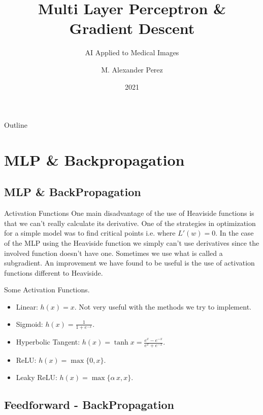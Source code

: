 \documentclass[presentation]{beamer}
\institute{Galileo University -- BiomedLab}
\author{M. Alexander Perez}
\date{2021}
\title{Multi Layer Perceptron \& Gradient Descent}
\subtitle{AI Applied to Medical Images}
\begin{document}
\maketitle
\begin{frame}{Outline}
\tableofcontents
\end{frame}


\section{MLP \& Backpropagation}
\label{sec:org0b67370}

\subsection{MLP \& BackPropagation}
\label{sec:org932be76}

\begin{frame}[label={sec:org665cab5}]{Activation Functions}
One main disadvantage of the use of Heaviside functions is that we can't really calculate its derivative. One of the strategies in optimization for a simple model was to find critical points i.e. where \(L'(w) = 0\). In the case of the MLP using the Heaviside function we simply can't use derivatives since the involved function doesn't have one. Sometimes we use what is called a subgradient. An improvement we have found to be useful is the use of activation functions different to Heaviside.
\end{frame}

\begin{frame}[label={sec:org6c96bf3}]{Some Activation Functions.}
\begin{itemize}
\item Linear: \(h(x) = x\). Not very useful with the methods we try to implement.
\item Sigmoid: \(h(x) = \frac{1}{1 + e^{-x}}\).
\item Hyperbolic Tangent: \(h(x) = \operatorname{tanh} x = \frac{e^x - e^{-x}}{e^x + e^{-x}}\).
\item ReLU: \(h(x) = \max \lbrace 0, x \rbrace\).
\item Leaky ReLU: \(h(x) = \max \lbrace \alpha \, x , x \rbrace\).
\end{itemize}
\end{frame}

\subsection{Feedforward - BackPropagation}
\label{sec:org3970d58}
\end{document}
